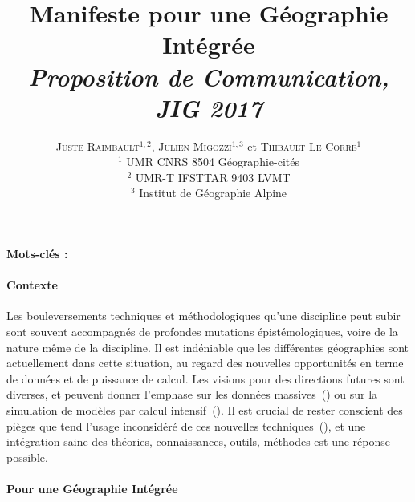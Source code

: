 \documentclass[11pt]{article}
\newcommand{\noun}[1]{\textsc{#1}}
\begin{document}
\title{Manifeste pour une Géographie Intégrée\\
\textit{Proposition de Communication, JIG 2017}
}
\author{\noun{Juste Raimbault}$^{1,2}$, \noun{Julien Migozzi}$^{1,3}$ et \noun{Thibault Le Corre}$^1$\\
$^1$ UMR CNRS 8504 Géographie-cités\\
$^2$ UMR-T IFSTTAR 9403 LVMT\\
$^3$ Institut de Géographie Alpine
}
\date{}

\maketitle

\justify



\textbf{Mots-clés : }\textit{}

\medskip


\paragraph{Contexte}

Les bouleversements techniques et méthodologiques qu'une discipline peut subir sont souvent accompagnés de profondes mutations épistémologiques, voire de la nature même de la discipline. Il est indéniable que les différentes géographies sont actuellement dans cette situation, au regard des nouvelles opportunités en terme de données et de puissance de calcul. Les visions pour des directions futures sont diverses, et peuvent donner l'emphase sur les données massives~(\cite{batty2012smart}) ou sur la simulation de modèles par calcul intensif~(\cite{pumain2017urban}). Il est crucial de rester conscient des pièges que tend l'usage inconsidéré de ces nouvelles techniques~(\cite{raimbault2016cautious}), et une intégration saine des théories, connaissances, outils, méthodes est une réponse possible.


\paragraph{Pour une Géographie Intégrée}
\end{document}
